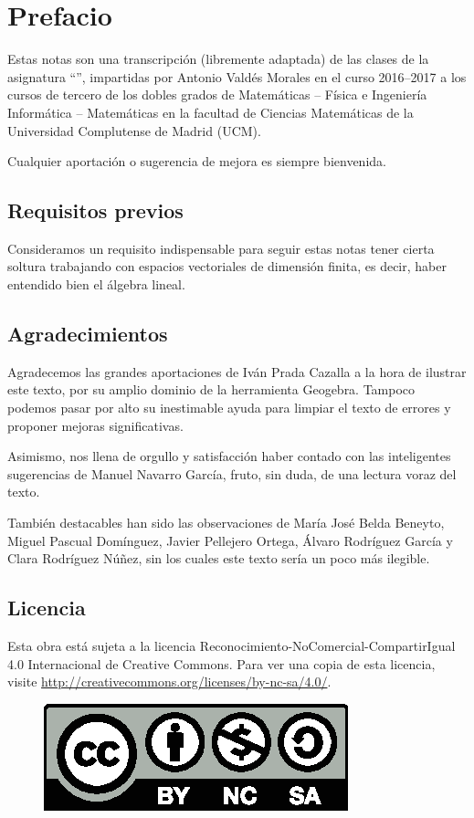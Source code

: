 \section*{Prefacio}
Estas notas son una transcripción (libremente adaptada) de las clases de la asignatura ``'', impartidas por Antonio Valdés Morales en el curso 2016--2017 a los cursos de tercero de los dobles grados de  Matemáticas -- Física e Ingeniería Informática -- Matemáticas en la facultad de Ciencias Matemáticas de la Universidad Complutense de Madrid (UCM).

Cualquier aportación o sugerencia de mejora es siempre bienvenida.
\subsection*{Requisitos previos}
Consideramos un requisito indispensable para seguir estas notas tener cierta soltura trabajando con espacios vectoriales de dimensión finita, es decir, haber entendido bien el álgebra lineal.

\subsection*{Agradecimientos}
Agradecemos las grandes aportaciones de Iván Prada Cazalla a la hora de ilustrar este texto, por su amplio dominio de la herramienta Geogebra. Tampoco podemos pasar por alto su inestimable ayuda para limpiar el texto de errores y proponer mejoras significativas.

Asimismo, nos llena de orgullo y satisfacción haber contado con las inteligentes sugerencias de Manuel Navarro García, fruto, sin duda, de una lectura voraz del texto.

También destacables han sido las observaciones de María José Belda Beneyto, Miguel Pascual Domínguez, Javier Pellejero Ortega, Álvaro Rodríguez García y Clara Rodríguez Núñez, sin los cuales este texto sería un poco más ilegible.
\subsection*{Licencia}
Esta obra está sujeta a la licencia Reconocimiento-NoComercial-CompartirIgual 4.0 Internacional de Creative Commons. Para ver una copia de esta licencia, visite \url{http://creativecommons.org/licenses/by-nc-sa/4.0/}.
\begin{figure}[h]
	\centering
	\includegraphics[scale=1]{Graficos/by-nc-sa.eps}
	\end{figure}